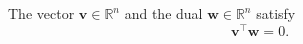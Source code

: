 The vector $\bm{v} \in \mathbb{R}^n$ and the dual $\boldsymbol{w} \in \mathbb{R}^n$ satisfy
\[
\bm{v}^\top \boldsymbol{w} = 0.
\]
